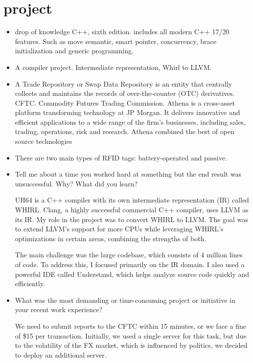 \documentclass[a4paper,11pt,twoside]{book}
\begin{document}
\chapter{project}
\begin{itemize}
	\item drop of knowledge C++, sixth edition. includes all modern C++ 17/20 features. Such as move semantic,  smart pointer, concurrency, brace initialization and generic programming. 
	
	\item A compiler project. Intermediate representation, Whirl to LLVM. 
	
	\item A Trade Repository or Swap Data Repository is an entity that centrally collects and maintains the records of over-the-counter (OTC) derivatives. CFTC. Commodity Futures Trading Commission.   Athena is a cross-asset platform transforming technology at JP Morgan. It delivers innovative and efficient applications to a wide range of the firm's businesses, including sales, trading, operations, risk and research. Athena combined the best of open source technologies
	
	\item There are two main types of RFID tags: battery-operated and passive. 
	
	
	\item Tell me about a time you worked hard at something but the end result was unsuccessful. Why? What did
	you learn?
	
	UH64 is a C++ compiler with its own intermediate representation (IR) called WHIRL. Clang, a highly successful commercial C++ compiler, uses LLVM as its IR. My role in the project was to convert WHIRL to LLVM. The goal was to extend LLVM’s support for more CPUs while leveraging WHIRL’s optimizations in certain areas, combining the strengths of both.
	
	The main challenge was the large codebase, which consists of 4 million lines of code. To address this, I focused primarily on the IR domain. I also used a powerful IDE called Understand, which helps analyze source code quickly and efficiently.
	
	\item What was the most demanding or time-consuming project or initiative in your recent work experience?
	
	We need to submit reports to the CFTC within 15 minutes, or we face a fine of \$15 per transaction. Initially, we used a single server for this task, but due to the volatility of the FX market, which is influenced by politics, we decided to deploy an additional server.
	

\end{itemize}
\end{document}

